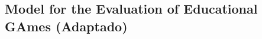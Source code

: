 \begin{apendicesenv}

\chapter{Model for the Evaluation of Educational GAmes (Adaptado)}\label{chap:Apreciacao}


\end{apendicesenv}
